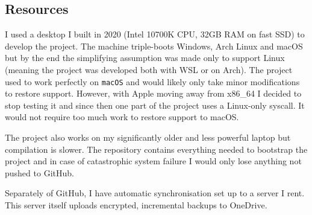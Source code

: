\subsection{Resources}

I used a desktop I built in 2020 (Intel 10700K CPU, 32GB RAM on fast SSD) to develop the project.
The machine triple-boots Windows, Arch Linux and macOS but by the end the simplifying assumption
was made only to support Linux (meaning the project was developed both with WSL or on Arch). The
project used to work perfectly on \texttt{macOS} and would likely only take minor modifications to
restore support. However, with Apple moving away from x86\_64 I decided to stop testing it and
since
then one part of the project uses a Linux-only syscall. It would not require too much work to
restore support to macOS.

The project also works on my significantly older and less powerful laptop but compilation is
slower.
The repository contains everything needed to bootstrap the project and in case of catastrophic
system failure I would only lose anything not pushed to GitHub.

Separately of GitHub, I have automatic synchronisation set up to a server I rent. This server
itself
uploads encrypted, incremental backups to OneDrive.
